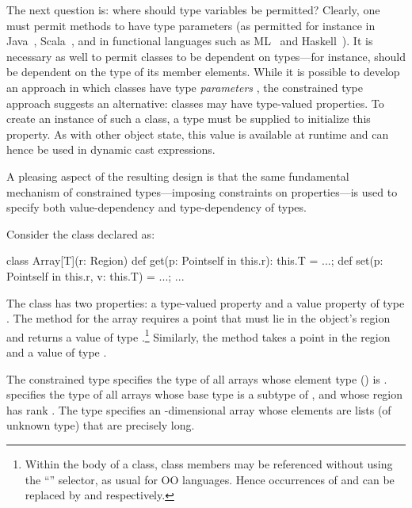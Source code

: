 The next question is: where should type variables be permitted?
Clearly, one must permit methods to have type parameters (as permitted
for instance in Java~\cite{Java3}, Scala~\cite{scala}, and in
functional languages such as ML~\cite{ml} and Haskell~\cite{haskell}).
It is necessary as well to permit classes to be dependent on types---for
instance,  should be dependent on the type of its
member elements. While it is possible to develop an approach in which
classes have type \emph{parameters} \cite{Java3}, the constrained
type approach suggests an alternative: classes may have type-valued
properties. To create an instance of such
a class, a type must be supplied to initialize this property. As with
other object state, this value is available at runtime and
can hence be used in dynamic cast expressions.

A pleasing aspect of the resulting design is that the same fundamental
mechanism of constrained types---imposing constraints on properties---is
used to specify both value-dependency and type-dependency of types.

\begin{example}[Array]
  Consider the class  declared as:
{\footnotesize
\begin{xten}
class Array[T](r: Region) {
  def get(p: Point{self in this.r}): this.T = ...;
  def set(p: Point{self in this.r}, v: this.T) = ...;
  ...
}
\end{xten}}
{}\noindent The class has two properties: a type-valued property
 and a value property  of type .
The  method for the array requires a
point  that must lie in the object's region and returns a
value of type .\footnote{Within the body of
a class, class members may be referenced without using the
``'' selector, as usual for OO languages. Hence occurrences of
 and  can be replaced by  and
 respectively.}
Similarly, the  method takes a point in the region and
a value of type .
\end{example}

The constrained type  specifies the type of all
arrays
whose element type () is .
 
specifies the type of all arrays whose base
type is a subtype of , and whose region has rank
.
The type 
 
specifies an -dimensional array whose elements are lists (of
unknown type) that are precisely  long.

